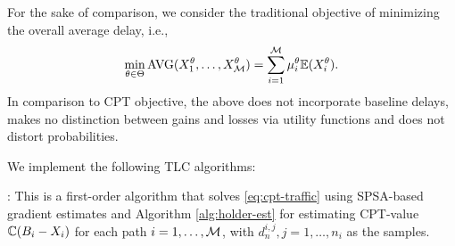 For the sake of comparison, we consider the traditional objective of minimizing the overall average delay, i.e.,
\begin{align}
\min_{\theta\in \Theta}\text{AVG}(X_1^\theta,\ldots,X_{\mathcal{M}}^\theta) = \sum_{i=1}^{\mathcal{M}} \mu_i^\theta \mathbb{E}(X_i^\theta). \label{eq:avg-traffic} 
\end{align}
In comparison to CPT objective, the above does not incorporate baseline delays, makes no distinction between gains and losses via utility functions and does not distort probabilities. 
% 
% 
% 

We implement the following TLC algorithms:

: This is a first-order algorithm that solves \eqref{eq:cpt-traffic} using SPSA-based gradient estimates and Algorithm \ref{alg:holder-est} for estimating CPT-value $\mathbb{C}(B_i-X_i)$ for each path $i=1,\ldots,\mathcal{M}$, with $d_n^{i,j}, j=1,\ldots,n_i$ as the samples.


